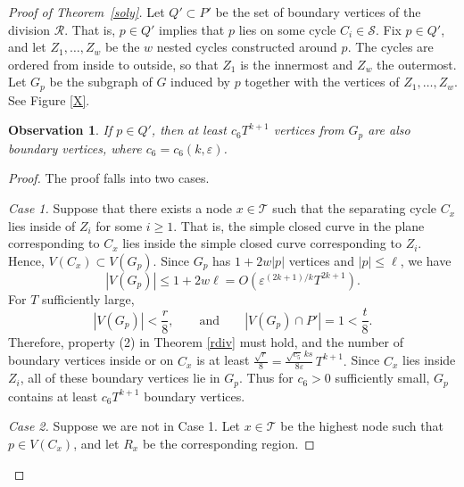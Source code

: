 \documentclass[10pt,a4paper]{amsart}
\newtheorem{observation}{Observation}
\begin{document}
\begin{proof}[Proof of Theorem~\ref{soly}]
 

Let \(Q' \subset P'\) be the set of boundary vertices of the division \(\mathcal R\).  That is, \(p\in Q'\) implies that \(p\) lies on some cycle \(C_i\in\mathcal S\). Fix \(p\in Q'\), and let \(Z_1,\dots,Z_w\) be the $w$ nested cycles constructed around $p$.  The cycles are ordered from inside to outside, so that \(Z_1\) is the innermost and \(Z_w\) the outermost. Let \(G_p\) be the subgraph of \(G\) induced by \(p\) together with the vertices of \(Z_1,\dots,Z_w\).  See Figure \ref{X}.














\begin{observation}
If $p \in Q'$, then at least  $c_6T^{k + 1}$ vertices from $G_p$ are also boundary vertices, where $c_6 = c_6(k,\varepsilon)$.
\end{observation}





\begin{proof}
 
The proof falls into two cases.

\medskip
\noindent\emph{Case 1.} Suppose that there exists a node \(x\in\mathcal T\) such that the separating cycle $C_x$ lies inside of $Z_i$ for some $i\geq 1$. That is, the simple closed curve in the plane corresponding to $C_x$ lies inside the simple closed curve corresponding to $Z_i$.  Hence, $V(C_x) \subset V(G_p)$.   Since \(G_p\) has \(1+2w|p|\) vertices and \(|p|\le \ell\), we have
\[
|V(G_p)| \le 1+2w\ell = O\!\left(\varepsilon^{(2k+1)/k}T^{2k+1}\right).
\]
For \(T\) sufficiently large,
\[
|V(G_p)|<\frac r8,
\qquad\text{and}\qquad
|V(G_p)\cap P'|=1<\frac t8.
\]
Therefore, property (2) in Theorem \ref{rdiv} must hold, and the number of boundary vertices inside or on \(C_x\) is at least $\frac{\sqrt r}{8}
=
\frac{\sqrt{c_5}\,ks}{8\varepsilon}\,
T^{k+1}.$  Since \(C_x\) lies inside $Z_i$, all of these boundary vertices lie in \(G_p\). Thus for $c_6 > 0$ sufficiently small, \(G_p\) contains at least $c_6 T^{k+1}$ boundary vertices.

\medskip
\noindent\emph{Case 2.} Suppose we are not in Case 1.  Let \(x\in\mathcal T\) be the highest node such that \(p\in V(C_x)\), and let \(R_x\) be the corresponding region. 


\end{proof}
\end{proof}
\end{document}
